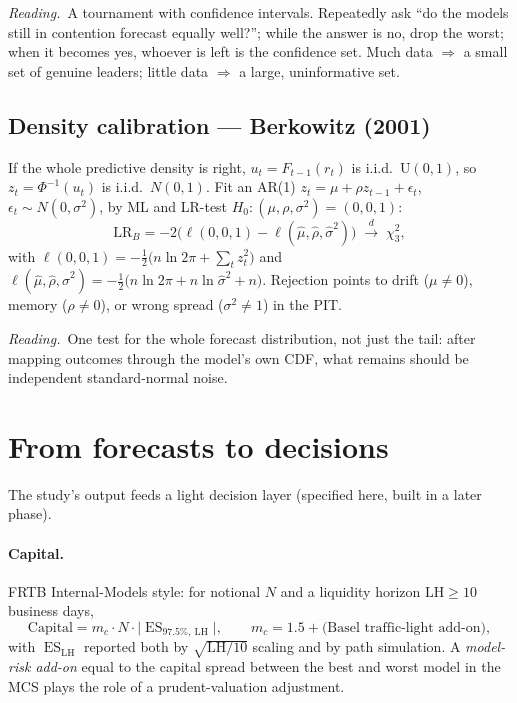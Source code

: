 \documentclass[11pt,a4paper]{article}
\newcommand{\ES}{\operatorname{ES}}
\newcommand{\dto}{\xrightarrow{d}}
\newcommand{\intuition}[1]{\par\smallskip\noindent\textit{Reading.}\ #1\par\smallskip}
\begin{document}
\intuition{A tournament with confidence intervals. Repeatedly ask ``do the
models still in contention forecast equally well?''; while the answer is no,
drop the worst; when it becomes yes, whoever is left is the confidence set. Much
data $\Rightarrow$ a small set of genuine leaders; little data $\Rightarrow$ a
large, uninformative set.}

\subsection{Density calibration --- Berkowitz (2001)}\label{sec:pit}

If the whole predictive density is right, $u_t = F_{t-1}(r_t)$ is i.i.d.\
$\mathrm{U}(0,1)$, so $z_t = \Phi^{-1}(u_t)$ is i.i.d.\ $N(0,1)$. Fit an AR(1)
$z_t = \mu + \rho z_{t-1} + \epsilon_t$, $\epsilon_t\sim N(0,\sigma^2)$, by ML and
LR-test $H_0:(\mu,\rho,\sigma^2)=(0,0,1)$:
\begin{equation}
  \mathrm{LR}_{B} = -2\big(\ell(0,0,1) - \ell(\hat\mu,\hat\rho,\hat\sigma^2)\big)
  \;\dto\;\chi^2_3 ,
\end{equation}
with $\ell(0,0,1) = -\tfrac12\big(n\ln 2\pi + \sum_t z_t^2\big)$ and
$\ell(\hat\mu,\hat\rho,\hat\sigma^2) = -\tfrac12\big(n\ln 2\pi + n\ln\hat\sigma^2 + n\big)$.
Rejection points to drift ($\mu\neq0$), memory ($\rho\neq0$), or wrong spread
($\sigma^2\neq1$) in the PIT.

\intuition{One test for the whole forecast distribution, not just the tail:
after mapping outcomes through the model's own CDF, what remains should be
independent standard-normal noise.}

\section{From forecasts to decisions}\label{sec:decision}

The study's output feeds a light decision layer (specified here, built in a
later phase).

\paragraph{Capital.} FRTB Internal-Models style: for notional $N$ and a
liquidity horizon $\text{LH}\ge10$ business days,
\begin{equation}
  \text{Capital} = m_c \cdot N \cdot \big|\ES_{97.5\%,\ \text{LH}}\big|,
  \qquad
  m_c = 1.5 + \text{(Basel traffic-light add-on)},
\end{equation}
with $\ES_{\text{LH}}$ reported both by $\sqrt{\text{LH}/10}$ scaling and by
path simulation. A \emph{model-risk add-on} equal to the capital spread between
the best and worst model in the MCS plays the role of a prudent-valuation
adjustment.
\end{document}
